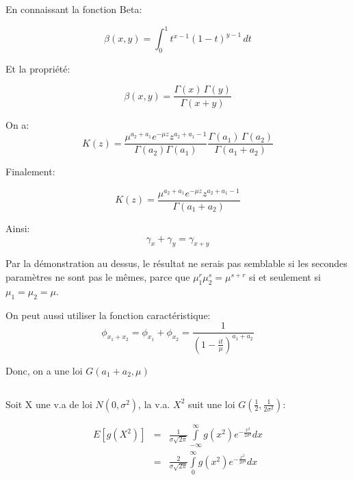 \documentclass[a4paper]{article}
\begin{document}
En connaissant la fonction Beta:

\begin{equation}
\mathbb{\beta}(x,y) = \int_0^1t^{x-1}(1-t)^{y-1}\,dt
\end{equation}

Et la propriété:

\begin{equation}
\beta(x,y)=\frac{\Gamma(x)\,\Gamma(y)}{\Gamma(x+y)}
\end{equation}

On a:
\begin{equation*}
K(z)=\frac{\mu^{a_2+a_1}e^{-\mu z}z^{a_2+a_1-1}}{\Gamma (a_2)\Gamma (a_1)}\frac{\Gamma(a_1)\,\Gamma(a_2)}{\Gamma(a_1+a_2)}
\end{equation*}

Finalement:

\begin{equation}
K(z)=\frac{\mu^{a_2+a_1}e^{-\mu z}z^{a_2+a_1-1}}{\Gamma(a_1+a_2)}
\end{equation}

Ainsi:
\begin{equation*}
\gamma_{x}+\gamma_{y}=\gamma_{x+y}
\end{equation*}

Par la démonstration au dessus, le résultat ne serais pas semblable si les secondes paramètres ne sont pas le mêmes, parce que 
$\mu_{1}^r \mu_{2}^s = \mu^{s+r}$ si et seulement si $\mu_1=\mu_2=\mu$.

On peut aussi utiliser la fonction caractéristique:
\begin{equation}
\phi_{x_1+x_2}=\phi_{x_1}+\phi_{x_2}=\frac{1}{(1-\frac{it}{\mu})^{a_1+a_2}}
\end{equation}

Donc, on a une loi $G(a_1+a_2,\mu)$



\subsection{}

Soit X une v.a de loi $N(0,\sigma^2)$, la v.a. $X^2$ suit une loi $G(\frac{1}{2},\frac{1}{2\sigma^2})$:

\begin{eqnarray*}
E[g(X^2)]&=&\frac{1}{\sigma\sqrt{2\pi}}\int\limits_{-\infty}^\infty g(x^2)e^{-\frac{x^2}{2\sigma²}}dx\\
&=&\frac{2}{\sigma\sqrt{2\pi}}\int\limits_{0}^\infty g(x^2)e^{-\frac{x^2}{2\sigma²}}dx
\end{eqnarray*}
\end{document}
